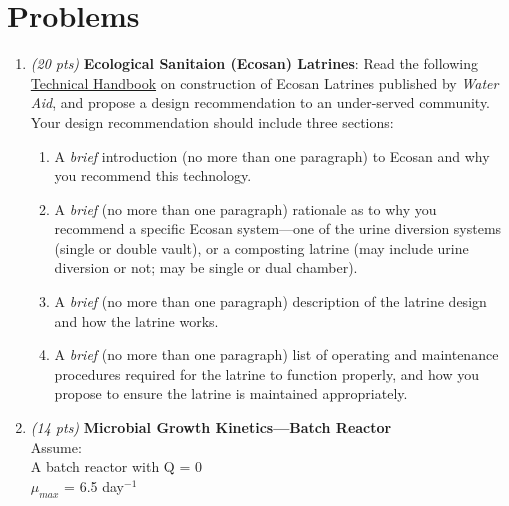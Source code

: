 \documentclass[12pt,letterpaper]{article}
\begin{document}
 

\section *{Problems}
\begin{enumerate}

\item \emph{(20 pts)} \textbf{Ecological Sanitaion (Ecosan) Latrines}:
Read the following \href{http://www.wateraid.org/~/media/Publications/construction-ecological-sanitation-latrine-technical-handbook.pdf}{Technical Handbook} on construction of Ecosan Latrines published by \emph{Water Aid}, and propose a design recommendation to an under-served community.  Your design recommendation should include three sections:

\begin{enumerate}
\item A \emph{brief} introduction (no more than one paragraph) to Ecosan and why you recommend this technology.
\item A \emph{brief} (no more than one paragraph) rationale as to why you recommend a specific Ecosan system---one of the urine diversion systems (single or double vault), or a composting latrine (may include urine diversion or not; may be single or dual chamber).
\item A \emph{brief} (no more than one paragraph) description of the latrine design and how the latrine works.
\item A \emph{brief} (no more than one paragraph) list of operating and maintenance procedures required for the latrine to function properly, and how you propose to ensure the latrine is maintained appropriately.
\end{enumerate}




\item \emph{(14 pts)} \textbf{Microbial Growth Kinetics---Batch Reactor}\\

Assume:\\

A batch reactor with Q = 0\\

%

$\mu_{max}$ = 6.5 day$^{-1}$\\


\end{enumerate}
\end{document}
